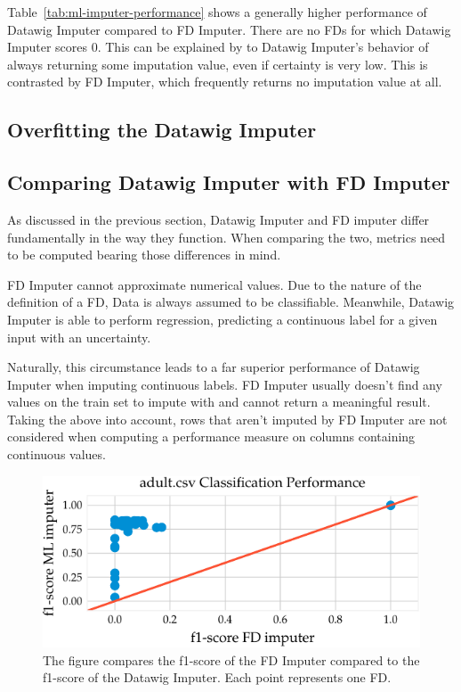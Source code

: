 Table~\ref{tab:ml-imputer-performance} shows a generally higher performance of Datawig Imputer compared to FD Imputer.
There are no FDs for which Datawig Imputer scores 0.
This can be explained by to Datawig Imputer's behavior of always returning some imputation value, even if certainty is very low.
This is contrasted by FD Imputer, which frequently returns no imputation value at all.

\subsection{Overfitting the Datawig Imputer}

\subsection{Comparing Datawig Imputer with FD Imputer}
As discussed in the previous section, Datawig Imputer and FD imputer differ fundamentally in the way they function.
When comparing the two, metrics need to be computed bearing those differences in mind.

FD Imputer cannot approximate numerical values.
Due to the nature of the definition of a FD, Data is always assumed to be classifiable.
Meanwhile, Datawig Imputer is able to perform regression, predicting a continuous label for a given input with an uncertainty.

Naturally, this circumstance leads to a far superior performance of Datawig Imputer when imputing continuous labels.
FD Imputer usually doesn't find any values on the train set to impute with and cannot return a meaningful result.
Taking the above into account, rows that aren't imputed by FD Imputer are not considered when computing a performance measure on columns containing continuous values.

\begin{figure}[h]
     \centering
     \includegraphics[width=.8\textwidth]{../figures/adult/f1_ml_fd_adult}
     \caption{The figure compares the f1-score of the FD Imputer compared to the f1-score of the Datawig Imputer. Each point represents one FD.}
     \label{fig:f1_ml_fd_adult}
 \end{figure}

